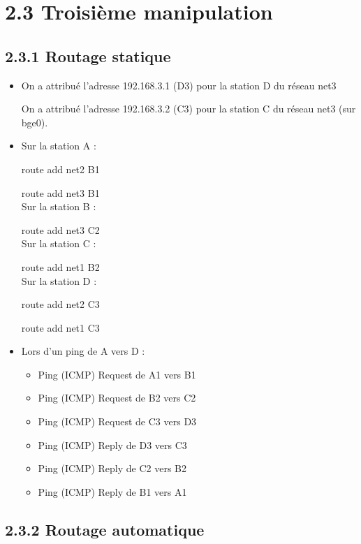 \documentclass{article}
\begin{document}
\section*{2.3 Troisième manipulation}

\subsection*{2.3.1 Routage statique}

\begin{itemize}\renewcommand{\labelitemi}{$\bullet$}
\item On a attribué l'adresse 192.168.3.1 (D3) pour la station D du réseau net3

On a attribué l'adresse 192.168.3.2 (C3) pour la station C du réseau net3 (sur bge0).
\item Sur la station A :

route add net2 B1

route add net3 B1\\

Sur la station B :

route add net3 C2\\

Sur la station C :

route add net1 B2\\

Sur la station D :

route add net2 C3

route add net1 C3\\

\item Lors d'un ping de A vers D :
	\begin{itemize}
		\item Ping (ICMP) Request de A1 vers B1
		\item Ping (ICMP) Request de B2 vers C2
		\item Ping (ICMP) Request de C3 vers D3
		\item Ping (ICMP) Reply de D3 vers C3
		\item Ping (ICMP) Reply de C2 vers B2
		\item Ping (ICMP) Reply de B1 vers A1
	\end{itemize}
\end{itemize}

\subsection*{2.3.2 Routage automatique}
\end{document}
